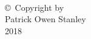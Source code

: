 

\thispagestyle{empty}
\hbox{\ }

\vfill
\renewcommand{\baselinestretch}{1}
\small\normalsize

\vspace{-.65in}

\begin{center}
\large{\copyright \hbox{ }Copyright by\\
Patrick Owen Stanley  %
\\
2018}
\end{center}

\vfill
